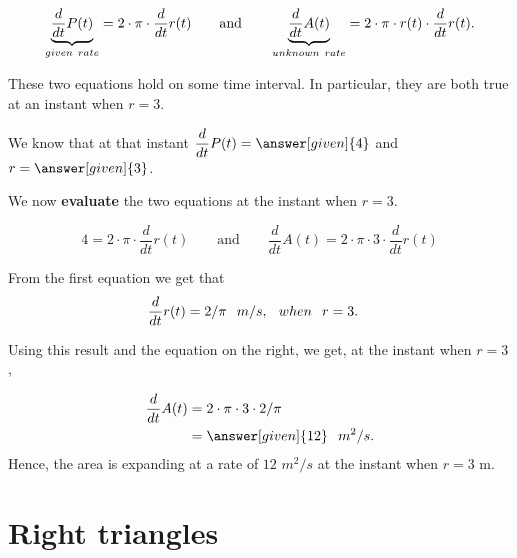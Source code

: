 \documentclass{ximera}
\begin{document}
\begin{example}
\begin{explanation}
    \[
  \underbrace{ \dfrac{d}{dt}P(t)}_{given\hspace{0.05in} rate} = 2\cdot \pi\cdot  \dfrac{d}{dt}r(t)
    \qquad\text{and}\qquad
    \underbrace{ \dfrac{d}{dt}A(t)}_{unknown \hspace{0.05in}rate} = 2\cdot \pi\cdot r(t) \cdot  \dfrac{d}{dt}r(t).
    \]
    
    These two equations hold on some time interval. In particular, they are both true at an instant when $r=3$.
    
   We know  that at that instant $ \dfrac{d}{dt}P(t) =
    \answer[given]{4}$ and $r = \answer[given]{3}$. 
    
    We now \textbf{evaluate}  the two equations at the instant when $r=3$.
    
        \[
    4 = 2\cdot \pi\cdot \dfrac{d}{dt}r(t)
    \qquad\text{and}\qquad
  \dfrac{d}{dt}A(t) = 2\cdot \pi\cdot 3 \cdot \dfrac{d}{dt}r(t) 
    \]
    
    
   From the first equation we get that
    \begin{align*}
     \dfrac{d}{dt}r(t)&=  2/\pi \hspace{0.1in} m/s, \hspace{0.1in} when \hspace{0.1in} r=3.    
    \end{align*} 
   
  Using this result and the equation on the right, we get, at the instant when $r=3$,
   
    \begin{align*}
    \dfrac{d}{dt}A(t) &= 2\cdot \pi\cdot 3 \cdot 2/\pi\\
      &=\answer[given]{12}\hspace{0.1in} m^2/s.
    \end{align*}
    Hence, the area is expanding at a rate of $12$ $m^2/s$ at the instant when $r=3$ m.
  \end{explanation}
\end{example}





\section{Right triangles}
\end{document}
